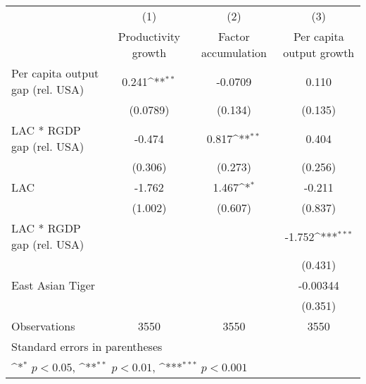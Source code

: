 {
\def\sym#1{\ifmmode^{#1}\else\(^{#1}\)\fi}
\begin{tabular}{l*{3}{c}}
\hline\hline
                    &\multicolumn{1}{c}{(1)}&\multicolumn{1}{c}{(2)}&\multicolumn{1}{c}{(3)}\\
                    &\multicolumn{1}{c}{Productivity growth}&\multicolumn{1}{c}{Factor accumulation}&\multicolumn{1}{c}{Per capita output growth}\\
\hline
Per capita output gap (rel. USA)&       0.241\sym{**} &     -0.0709         &       0.110         \\
                    &    (0.0789)         &     (0.134)         &     (0.135)         \\
[1em]
LAC * RGDP gap (rel. USA)&      -0.474         &       0.817\sym{**} &       0.404         \\
                    &     (0.306)         &     (0.273)         &     (0.256)         \\
[1em]
LAC                 &      -1.762         &       1.467\sym{*}  &      -0.211         \\
                    &     (1.002)         &     (0.607)         &     (0.837)         \\
[1em]
LAC * RGDP gap (rel. USA)&                     &                     &      -1.752\sym{***}\\
                    &                     &                     &     (0.431)         \\
[1em]
East Asian Tiger    &                     &                     &    -0.00344         \\
                    &                     &                     &     (0.351)         \\
\hline
Observations        &        3550         &        3550         &        3550         \\
\hline\hline
\multicolumn{4}{l}{\footnotesize Standard errors in parentheses}\\
\multicolumn{4}{l}{\footnotesize \sym{*} \(p<0.05\), \sym{**} \(p<0.01\), \sym{***} \(p<0.001\)}\\
\end{tabular}
}
